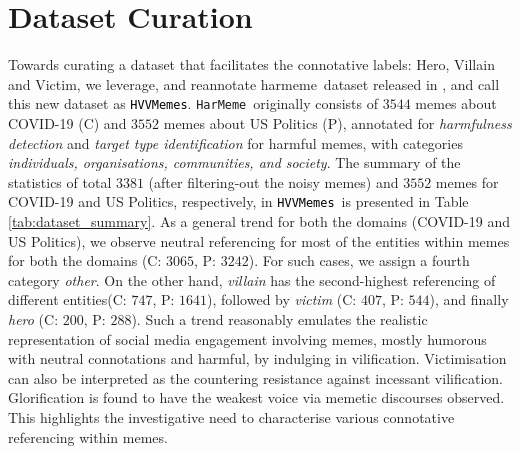 \documentclass[11pt]{article}
\newcommand{\dataset}{\textcolor{black}{\texttt{HVVMemes}}}
\newcommand{\harmeme}{\texttt{HarMeme}}
\begin{document}
\section{Dataset Curation}
\label{sec:dataset}
Towards curating a dataset that facilitates the connotative labels: Hero, Villain and Victim, we leverage, and reannotate harmeme\ dataset released in 
\cite{pramanick-etal-2021-momenta-multimodal}, and call this new dataset as \dataset.
\harmeme\ originally consists of $3544$ memes about COVID-19 (C) and $3552$ memes about US Politics (P), annotated for \textit{harmfulness detection} and \textit{target type identification} for harmful memes, with categories  \textit{individuals, organisations, communities, and society}. 
The summary of the statistics of total $3381$ (after filtering-out the noisy memes) and $3552$ memes for COVID-19 and US Politics, respectively, in \dataset\ is presented in Table \ref{tab:dataset_summary}. As a general trend for both the domains (COVID-19 and US Politics), we observe neutral referencing for most of the entities within memes for both the domains (C: $3065$, P: $3242$). For such cases, we assign a fourth category \textit{other}. On the other hand, \textit{villain} has the second-highest referencing of different entities(C: $747$, P: $1641$), followed by \textit{victim} (C: $407$, P: $544$), and finally \textit{hero} (C: $200$, P: $288$). Such a trend reasonably emulates the realistic representation of social media engagement involving memes, mostly humorous with neutral connotations and harmful, by indulging in vilification. Victimisation can also be interpreted as the countering resistance against incessant vilification. Glorification is found to have the weakest voice via memetic discourses observed. This highlights the investigative need to characterise various connotative referencing within memes.
\end{document}
